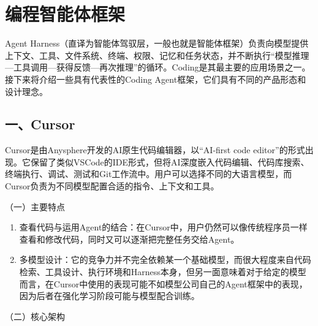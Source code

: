 \clearpage

\hypertarget{ux7f16ux7a0bux667aux80fdux4f53ux6846ux67b6}{%
\section{编程智能体框架}\label{ux7f16ux7a0bux667aux80fdux4f53ux6846ux67b6}}

Agent Harness（直译为智能体驾驭层，一般也就是智能体框架）负责向模型提供上下文、工具、文件系统、终端、权限、记忆和任务状态，并不断执行``模型推理---工具调用---获得反馈---再次推理''的循环。Coding是其最主要的应用场景之一。接下来将介绍一些具有代表性的Coding Agent框架，它们具有不同的产品形态和设计理念。

\hypertarget{ux4e00cursor}{%
\subsection{一、Cursor}\label{ux4e00cursor}}

Cursor是由Anysphere开发的AI原生代码编辑器，以``AI-first code editor''的形式出现。它保留了类似VSCode的IDE形式，但将AI深度嵌入代码编辑、代码库搜索、终端执行、调试、测试和Git工作流中。用户可以选择不同的大语言模型，而Cursor负责为不同模型配置合适的指令、上下文和工具。

（一）主要特点

\begin{enumerate}
\def\labelenumi{\arabic{enumi}.}
\item
  查看代码与运用Agent的结合：在Cursor中，用户仍然可以像传统程序员一样查看和修改代码，同时又可以逐渐把完整任务交给Agent。
\item
  多模型设计：它的竞争力并不完全依赖某一个基础模型，而很大程度来自代码检索、工具设计、执行环境和Harness本身，但另一面意味着对于给定的模型而言，在Cursor中使用的表现可能不如模型公司自己的Agent框架中的表现，因为后者在强化学习阶段可能与模型配合训练。
\end{enumerate}

（二）核心架构

